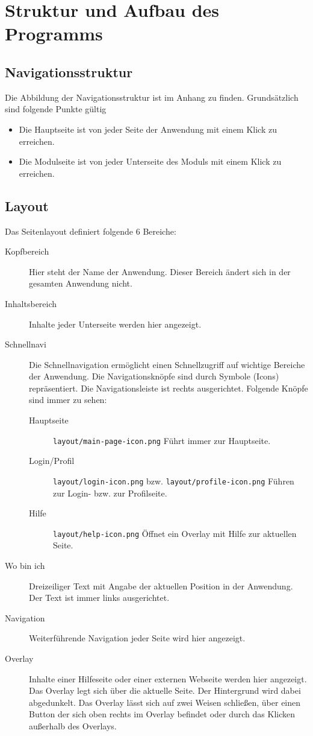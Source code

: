 \chapter{Struktur und Aufbau des Programms}

%
%
%
\section{Navigationsstruktur}
\label{sec:navigation}
Die Abbildung der Navigationsstruktur ist im Anhang zu finden.
Grundsätzlich sind folgende Punkte gültig
\begin{itemize}
  \item Die Hauptseite ist von jeder Seite der Anwendung mit einem Klick zu erreichen.
  \item Die Modulseite ist von jeder Unterseite des Moduls mit einem Klick zu erreichen.
\end{itemize}

%
%
%
\section{Layout}
\label{sec:layout}

Das Seitenlayout definiert folgende 6 Bereiche:
\begin{description}
  \item[Kopfbereich] Hier steht der Name der Anwendung. Dieser Bereich ändert sich in der gesamten Anwendung nicht.
  \item[Inhaltsbereich] Inhalte jeder Unterseite werden hier angezeigt.
  \item[Schnellnavi] Die Schnellnavigation ermöglicht einen Schnellzugriff auf wichtige Bereiche der Anwendung. Die Navigationsknöpfe sind durch Symbole (Icons) repräsentiert. Die Navigationsleiste ist rechts ausgerichtet. Folgende Knöpfe sind immer zu sehen:
  \begin{description}
    \item[Hauptseite] \texttt{layout/main-page-icon.png} Führt immer zur Hauptseite. 
    \item[Login/Profil] \texttt{layout/login-icon.png} bzw. \texttt{layout/profile-icon.png} Führen zur Login- bzw. zur Profilseite. 
    \item[Hilfe] \texttt{layout/help-icon.png} Öffnet ein Overlay mit Hilfe zur aktuellen Seite. 
  \end{description}
  
  \item[Wo bin ich] Dreizeiliger Text mit Angabe der aktuellen Position in der Anwendung. Der Text ist immer links ausgerichtet.
  \item[Navigation] Weiterführende Navigation jeder Seite wird hier angezeigt.
  \item[Overlay] Inhalte einer Hilfeseite oder einer externen Webseite werden hier angezeigt.
	Das Overlay legt sich über die aktuelle Seite. Der Hintergrund wird dabei abgedunkelt. 
	Das Overlay lässt sich auf zwei Weisen schließen, über einen Button der sich oben rechts im Overlay befindet oder durch das Klicken außerhalb des Overlays.
\end{description}


